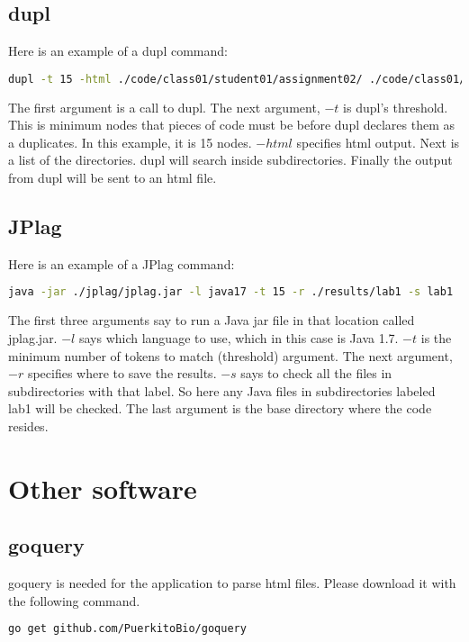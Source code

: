 \documentclass[12pt]{article}
\begin{document}
		\subsection{dupl}
			Here is an example of a dupl command:
			\begin{lstlisting}[language=bash, breaklines=true]
dupl -t 15 -html ./code/class01/student01/assignment02/ ./code/class01/student02/assignment02/ ./code/class01/student03/assignment02/ > assignment02.html &
			\end{lstlisting}
			\noindent The first argument is a call to dupl. The next argument, $-t$ is dupl's threshold. This is minimum nodes that pieces of code must be before dupl declares them as a duplicates. In this example, it is 15 nodes. $-html$ specifies html output. Next is a list of the directories. dupl will search inside subdirectories. Finally the output from dupl will be sent to an html file.
			
		\subsection{JPlag}
			Here is an example of a JPlag command:
			\begin{lstlisting}[language=bash, breaklines=true]		
java -jar ./jplag/jplag.jar -l java17 -t 15 -r ./results/lab1 -s lab1 ./students
			\end{lstlisting}
			\noindent The first three arguments say to run a Java jar file in that location called jplag.jar. $-l$ says which language to use, which in this case is Java 1.7. $-t$ is the minimum number of tokens to match (threshold) argument. The next argument, $-r$ specifies where to save the results. $-s$ says to check all the files in subdirectories with that label. So here any Java files in subdirectories labeled lab1 will be checked. The last argument is the base directory where the code resides.
			
	\section{Other software}
		\subsection{goquery}
			goquery is needed for the application to parse html files. Please download it with the following command.
			\begin{lstlisting}[language=bash]
go get github.com/PuerkitoBio/goquery
			\end{lstlisting}
			
\end{document}
